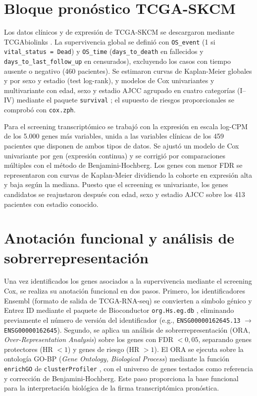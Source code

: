 \section{Bloque pronóstico TCGA-SKCM}

Los datos clínicos y de expresión de TCGA-SKCM se descargaron mediante TCGAbiolinks \cite{Colaprico2016}. La supervivencia global se definió con \texttt{OS\_event} (1 si \texttt{vital\_status = Dead}) y \texttt{OS\_time} (\texttt{days\_to\_death} en fallecidos y \texttt{days\_to\_last\_follow\_up} en censurados), excluyendo los casos con tiempo ausente o negativo (460 pacientes). Se estimaron curvas de Kaplan-Meier globales y por sexo y estadio (test log-rank), y modelos de Cox univariantes y multivariante con edad, sexo y estadio AJCC agrupado en cuatro categorías (I--IV) mediante el paquete \texttt{survival} \cite{Therneau2023}; el supuesto de riesgos proporcionales se comprobó con \texttt{cox.zph}.

Para el screening transcriptómico se trabajó con la expresión en escala log-CPM de los 5.000 genes más variables, unida a las variables clínicas de los 459 pacientes que disponen de ambos tipos de datos. Se ajustó un modelo de Cox univariante por gen (expresión continua) y se corrigió por comparaciones múltiples con el método de Benjamini-Hochberg. Los genes con menor FDR se representaron con curvas de Kaplan-Meier dividiendo la cohorte en expresión alta y baja según la mediana. Puesto que el screening es univariante, los genes candidatos se reajustaron después con edad, sexo y estadio AJCC sobre los 413 pacientes con estadio conocido.

\section{Anotación funcional y análisis de sobrerrepresentación}

Una vez identificados los genes asociados a la supervivencia mediante el screening Cox, se realiza su anotación funcional en dos pasos. Primero, los identificadores Ensembl (formato de salida de TCGA-RNA-seq) se convierten a símbolo génico y Entrez ID mediante el paquete de Bioconductor \texttt{org.Hs.eg.db} \cite{OrgHsEgDb}, eliminando previamente el número de versión del identificador (e.g., \texttt{ENSG00000162645.13} $\to$ \texttt{ENSG00000162645}). Segundo, se aplica un análisis de sobrerrepresentación (ORA, \textit{Over-Representation Analysis}) sobre los genes con FDR $< 0{,}05$, separando genes protectores (HR $< 1$) y genes de riesgo (HR $> 1$). El ORA se ejecuta sobre la ontología GO-BP (\textit{Gene Ontology, Biological Process}) mediante la función \texttt{enrichGO} de \texttt{clusterProfiler} \cite{clusterProfiler2012}, con el universo de genes testados como referencia y corrección de Benjamini-Hochberg. Este paso proporciona la base funcional para la interpretación biológica de la firma transcriptómica pronóstica.

